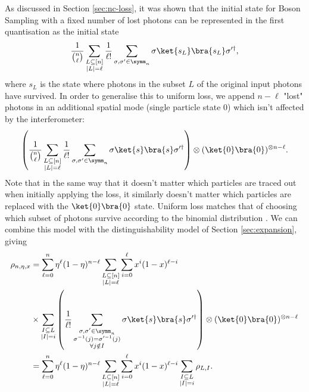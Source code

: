 As discussed in Section \ref{sec:nc-loss}, it was shown that the initial state for Boson Sampling with a fixed number of lost photons can be represented in the first quantisation as the initial state
\begin{equation}
\frac{1}{\binom{n}{\ell}}\sum_{\substack{L\subseteq[n]\\|L|=\ell}}\frac{1}{\ell!}\sum_{\sigma,\sigma'\in\symm_n}\sigma\ket{s_L}\bra{s_L}\sigma'^\dagger,
\end{equation}
where $s_L$ is the state where photons in the subset $L$ of the original input photons have survived. 
In order to generalise this to uniform loss, we append $n-\ell$ "lost" photons in an additional spatial mode (single particle state $0$) which isn't affected by the interferometer:
\begin{align}
\left(\frac{1}{\binom{n}{\ell}}\sum_{\substack{L\subseteq[n]\\|L|=\ell}}\frac{1}{\ell!}\sum_{\sigma,\sigma'\in\symm_n}\sigma\ket{s}\bra{s}\sigma'^\dagger\right)\otimes(\ket{0}\bra{0})^{\otimes n-\ell}.
\end{align}
Note that in the same way that it doesn't matter which particles are traced out when initially applying the loss, it similarly doesn't matter which particles are replaced with the $\ket{0}\bra{0}$ state. 
Uniform loss matches that of choosing which subset of photons survive according to the binomial distribution \cite{oszmaniec2018,renema2018loss}. 
We can combine this model with the distinguishability model of Section \ref{sec:expansion}, giving
\begin{align}
\rho_{n,\eta,x}&=\sum_{\ell=0}^n\eta^\ell(1-\eta)^{n-\ell}\sum_{\substack{L\subseteq[n]\\|L|=\ell}}\sum_{i=0}^\ell x^i(1-x)^{\ell-i}\nonumber\\
&\times\sum_{\substack{I\subseteq L\\|I|=i}}\left(\frac{1}{\ell!}\sum_{\substack{\sigma,\sigma'\in\symm_n\\\sigma^{-1}(j)=\sigma'^{-1}(j)\\\forall j \notin I}}\sigma\ket{s}\bra{s}\sigma'^\dagger\right)\otimes(\ket{0}\bra{0})^{\otimes n-\ell}\\
&=\sum_{\ell=0}^n\eta^\ell(1-\eta)^{n-\ell}\sum_{\substack{L\subseteq[n]\\|L|=\ell}}\sum_{i=0}^\ell x^i(1-x)^{\ell-i}\sum_{\substack{I\subseteq L\\|I|=i}}\rho_{L,I}.
\end{align}

